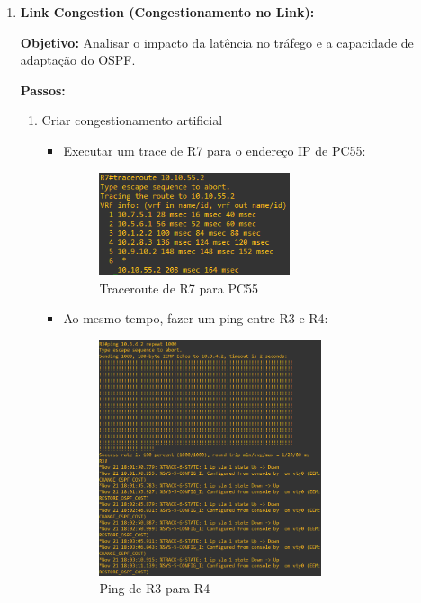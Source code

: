 \documentclass[11pt,english, openright, oneside]{book}
\begin{document}
\begin{enumerate}
  \item \textbf{Link Congestion (Congestionamento no Link):} \par \vspace{0.2cm}
    \textbf{Objetivo:} Analisar o impacto da latência no tráfego e a capacidade de adaptação do OSPF. \par \vspace{0.2cm}
    
    \textbf{Passos:}
      \begin{enumerate}
        \item Criar congestionamento artificial
          \begin{itemize}
            \item Executar um trace de R7 para o endereço IP de PC55:
              \begin{figure}[H]
                \centering
                \includegraphics[width=0.6\textwidth]{imagens/Tarefa6/29.link_congestion_1.png}
                \caption{Traceroute de R7 para PC55}
                \label{fig:config43}
              \end{figure}
            
            \pagebreak
            \item Ao mesmo tempo, fazer um ping entre R3 e R4:
              \begin{figure}[H]
                \centering
                \includegraphics[width=0.7\textwidth]{imagens/Tarefa6/29.link_congestion_2.png}
                \caption{Ping de R3 para R4}
                \label{fig:config44}
              \end{figure}   
          \end{itemize}
        

\end{enumerate}
\end{enumerate}
\end{document}
